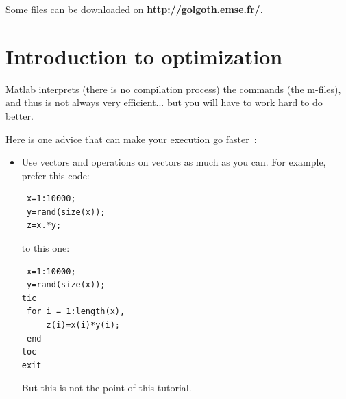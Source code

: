 \documentclass{emse-exo}
\begin{document}


\noindent
Some files can be downloaded on \textbf{http://golgoth.emse.fr/}.

\section{Introduction to optimization}
Matlab interprets (there is no compilation process) the commands (the m-files), and thus is not always very efficient... but you will have to work hard to do better.

Here is one advice that can make your execution go faster~:
\begin{itemize}
 \item Use vectors and operations on vectors as much as you can. For example, prefer this code:
\begin{lstlisting}
 x=1:10000;
 y=rand(size(x));
 z=x.*y;
\end{lstlisting}

to this one:
\begin{lstlisting}
 x=1:10000;
 y=rand(size(x));
tic
 for i = 1:length(x),
     z(i)=x(i)*y(i);
 end
toc
exit
\end{lstlisting}
But this is not the point of this tutorial.

\end{itemize}
\end{document}
